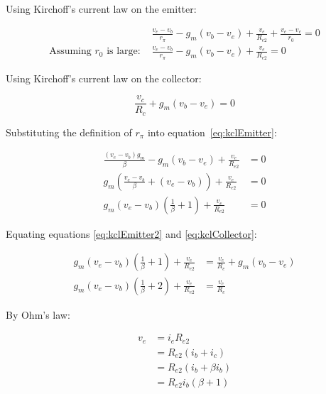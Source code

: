 \documentclass[a4paper,11pt]{article}
\begin{document}
Using Kirchoff's current law on the emitter:

\begin{subequations}
\begin{align}
&\frac{v_e - v_b}{r_\pi} - g_m (v_b - v_e) + \frac{v_e}{R_{e2}} + \frac{v_e - v_c}{r_0} = 0\\
\textrm{Assuming $r_0$ is large: } &\frac{v_e - v_b}{r_\pi} - g_m (v_b - v_e) + \frac{v_e}{R_{e2}} = 0 \label{eq:kclEmitter}
\end{align}
\end{subequations}

Using Kirchoff's current law on the collector:

\begin{equation} \label{eq:kclCollector}
\frac{v_c}{R_c} + g_m(v_b - v_e) = 0
\end{equation}

Substituting the definition of $r_\pi$ into equation~\ref{eq:kclEmitter}:

\begin{subequations}
\begin{align}
\frac{(v_e - v_b)g_m}{\beta} - g_m(v_b - v_e) + \frac{v_e}{R_{e2}} &= 0\\
g_m \left( \frac{v_e - v_b}{\beta} + (v_e - v_b) \right) + \frac{v_e}{R_{e2}} &= 0\\
g_m (v_e - v_b) \left( \frac{1}{\beta} + 1 \right) + \frac{v_e}{R_{e2}} &= 0 \label{eq:kclEmitter2}
\end{align}
\end{subequations}

Equating equations \ref{eq:kclEmitter2} and \ref{eq:kclCollector}:

\begin{subequations}
\begin{align}
g_m (v_e - v_b) \left( \frac{1}{\beta} + 1 \right) + \frac{v_e}{R_{e2}} &= \frac{v_c}{R_c} + g_m(v_b - v_e)\\
g_m (v_e - v_b) \left( \frac{1}{\beta} + 2 \right) + \frac{v_e}{R_{e2}} &= \frac{v_c}{R_c} \label{eq:emitterEqCollector}
\end{align}
\end{subequations}

By Ohm's law:

\begin{subequations}
\begin{align}
v_e &= i_e R_{e2}\\
&= R_{e2} (i_b + i_c)\\
&= R_{e2} (i_b + \beta i_b)\\
&= R_{e2} i_b (\beta + 1) \label{eq:v_e}
\end{align}
\end{subequations}
\end{document}

